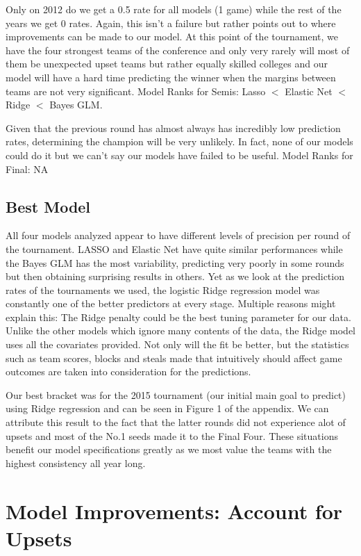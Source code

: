 \documentclass{article} %
\begin{document}
Only on 2012 do we get a 0.5 rate for all models (1 game) while the rest of the years we get 0 rates. Again, this isn't a failure but rather points out to where improvements can be made to our model. At this point of the tournament, we have the four strongest teams of the conference and only very rarely will most of them be unexpected upset teams but rather equally skilled colleges and our model will have a hard time predicting the winner when the margins between teams are not very significant. Model Ranks for Semis: Lasso  $<$ Elastic Net $<$ Ridge $<$ Bayes GLM.  

Given that the previous round has almost always has incredibly low prediction rates, determining the champion will be very unlikely. In fact, none of our models could do it but we can't say our models have failed to be useful. Model Ranks for Final: NA

\subsection{Best Model}

All four models analyzed appear to have different levels of precision per round of the tournament. LASSO and Elastic Net have quite similar performances while the Bayes GLM has the most variability, predicting very poorly in some rounds but then obtaining surprising results in others. Yet as we look at the prediction rates of the tournaments we used, the logistic Ridge regression model was constantly one of the better predictors at every stage. Multiple reasons might explain this: The Ridge penalty could be the best tuning parameter for our data. Unlike the other models which ignore many contents of the data, the Ridge model uses all the covariates provided. Not only will the fit be better, but the statistics such as team scores, blocks and steals made that intuitively should affect game outcomes are taken into consideration for the predictions.

Our best bracket was for the 2015 tournament (our initial main goal to predict) using Ridge regression and can be seen in Figure 1 of the appendix. We can attribute this result to the fact that the latter rounds did not experience alot of upsets and most of the No.1 seeds made it to the Final Four. These situations benefit our model specifications greatly as we most value the teams with the highest consistency all year long.

\section{Model Improvements: Account for Upsets}
\end{document}

